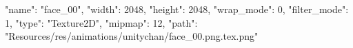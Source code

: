 {
  "name": "face_00",
  "width": 2048,
  "height": 2048,
  "wrap_mode": 0,
  "filter_mode": 1,
  "type": "Texture2D",
  "mipmap": 12,
  "path": "Resources/res/animations/unitychan/face_00.png.tex.png"
}